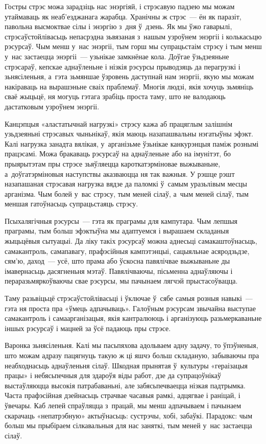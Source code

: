 Гостры стрэс можа зарадзіць нас энэргіяй, і стрэсавую падзею мы можам утаймаваць як неаб'езджанага жарабца. Хранічны ж стрэс~--- ён як паразіт, павольна высмоктвае сілы і энэргію з~дня ў~дзень. Як мы ўжо гаварылі, стрэсаўстойлівасьць непасрэдна зьвязаная з~нашым узроўнем энэргіі і колькасьцю рэсурсаў. Чым менш у~нас энэргіі, тым горш мы супрацьстаім стрэсу і тым менш у~нас застаецца энэргіі~--- узьнікае замкнёнае кола. Доўгае ўзьдзеяньне стрэсараў, кепскае аднаўленьне і нізкія рэсурсы прыводзяць да перагрузкі і зьнясіленьня, а~гэта зьмяншае ўзровень даступнай нам энэргіі, якую мы можам накіраваць на вырашэньне сваіх праблемаў. Многія людзі, якія хочуць зьмяніць сваё жыцьцё, ня могуць гэтага зрабіць проста таму, што не валодаюць дастатковым узроўнем энэргіі.

Канцэпцыя «аластатычнай нагрузкі» стрэсу кажа аб працяглым залішнім узьдзеяньні стрэсавых чыньнікаў, якія маюць назапашвальны нэгатыўны эфэкт. Калі нагрузка занадта вялікая, у~арганізьме ўзьнікае канкурэнцыя паміж рознымі працэсамі. Можа бракаваць рэсурсаў на аднаўленьне або на імунітэт, бо прыярытэтам пры стрэсе зьяўляецца кароткатэрміновае выжываньне, а~доўгатэрміновыя наступствы аказваюцца ня так важныя. У рэшце рэшт назапашаная стрэсавая нагрузка вядзе да паломкі ў~самым уразьлівым месцы арганізма. Чым болей у~вас стрэсу, тым меней сілаў, а~чым меней сілаў, тым меншая гатоўнасьць супрацьстаяць стрэсу.

Псыхалягічныя рэсурсы~--- гэта як праграмы для кампутара. Чым лепшыя праграмы, тым больш эфэктыўна мы адаптуемся і вырашаем складаныя жыцьцёвыя сытуацыі. Да ліку такіх рэсурсаў можна аднесьці самакаштоўнасьць, самакантроль, самапавагу, прафэсійныя кампэтэнцыі, сацыяльнае асяродзьдзе, сям'ю, даход~--- усё, што прама або ўскосна павялічвае выжываньне ды імавернасьць дасягненьня мэтаў. Павялічваючы, пісьменна аднаўляючы і пераразьмяркоўваючы свае рэсурсы, мы пачынаем лягчэй прыстасоўвацца. 

Таму разьвіцьцё стрэсаўстойлівасьці і ўключае ў~сябе самыя розныя навыкі~--- гэта ня проста пра «ўмець адпачываць». Галоўным рэсурсам звычайна выступае самакантроль і самаарганізацыя, якія кантралююць і арганізуюць разьмеркаваньне іншых рэсурсаў і мацней за ўсё падаюць пры стрэсе.

Варонка зьнясіленьня. Калі мы пасьпяхова адольваем адну задачу, то ўпэўненыя, што можам адразу пацягнуць такую ж ці яшчэ больш складаную, забываючы пра неабходнасьць аднаўленьня сілаў. Шкодная прынятая ў~культуры «гераізацыя працы» і небясьпечныя для здароўя віды работ, дзе да супрацоўнікаў выстаўляюцца высокія патрабаваньні, але забясьпечваецца нізкая падтрымка. Часта прафэсійная дзейнасьць страчвае часавыя рамкі, адцягвае і раніцай, і ўвечары. Каб лепей спраўляцца з~працай, мы менш адпачываем і пачынаем скарачаць «непатрэбную» актыўнасьць: сустрэчы, хобі, забаўкі. Парадокс: чым больш мы прыбіраем сілкавальныя для нас заняткі, тым меней у~нас застаецца сілаў.

